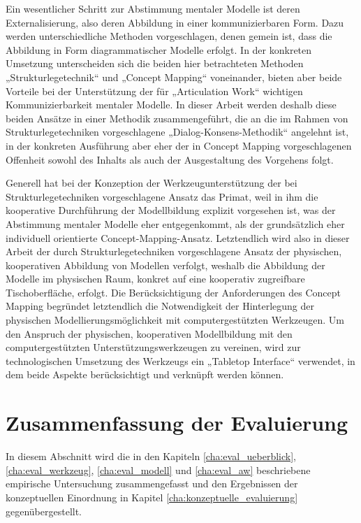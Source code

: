 Ein wesentlicher Schritt zur Abstimmung mentaler Modelle ist deren Externalisierung, also deren Abbildung in einer kommunizierbaren Form. Dazu werden unterschiedliche Methoden vorgeschlagen, denen gemein ist, dass die Abbildung in Form diagrammatischer Modelle erfolgt. In der konkreten Umsetzung unterscheiden sich die beiden hier betrachteten Methoden „Strukturlegetechnik“ und „Concept Mapping“ voneinander, bieten aber beide Vorteile bei der Unterstützung der für „Articulation Work“ wichtigen Kommunizierbarkeit mentaler Modelle. In dieser Arbeit werden deshalb diese beiden Ansätze in einer Methodik zusammengeführt, die an die im Rahmen von Strukturlegetechniken vorgeschlagene „Dialog-Konsens-Methodik“ angelehnt ist, in der konkreten Ausführung aber eher der in Concept Mapping vorgeschlagenen Offenheit sowohl des Inhalts als auch der Ausgestaltung des Vorgehens folgt. 

Generell hat bei der Konzeption der Werkzeugunterstützung der bei Strukturlegetechniken vorgeschlagene Ansatz das Primat, weil in ihm die kooperative Durchführung der Modellbildung explizit vorgesehen ist, was der Abstimmung mentaler Modelle eher entgegenkommt, als der grundsätzlich eher individuell orientierte Concept-Mapping-Ansatz. Letztendlich wird also in dieser Arbeit der durch Strukturlegetechniken vorgeschlagene Ansatz der physischen, kooperativen Abbildung von Modellen verfolgt, weshalb die Abbildung der Modelle im physischen Raum, konkret auf eine kooperativ zugreifbare Tischoberfläche, erfolgt. Die Berücksichtigung der Anforderungen des Concept Mapping begründet letztendlich die Notwendigkeit der Hinterlegung der physischen Modellierungsmöglichkeit mit computergestützten Werkzeugen. Um den Anspruch der physischen, kooperativen Modellbildung mit den computergestützten Unterstützungswerkzeugen zu vereinen, wird zur technologischen Umsetzung des Werkzeugs ein „Tabletop Interface“ verwendet, in dem beide Aspekte berücksichtigt und verknüpft werden können.


\section{Zusammenfassung der Evaluierung}
\label{sec:zusammenfassung_der_evaluierung}

In diesem Abschnitt wird die in den Kapiteln \ref{cha:eval_ueberblick}, \ref{cha:eval_werkzeug}, \ref{cha:eval_modell} und \ref{cha:eval_aw} beschriebene empirische Untersuchung zusammengefasst und den Ergebnissen der konzeptuellen Einordnung in Kapitel \ref{cha:konzeptuelle_evaluierung} gegenübergestellt.

